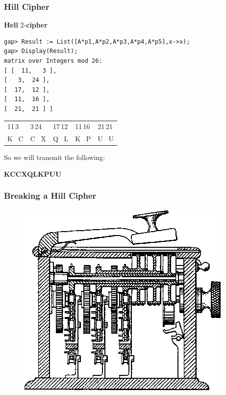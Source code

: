 \documentclass{beamer}
\theoremstyle{definition}
\theoremstyle{remark}
\begin{document}
\begin{frame}
	\frametitle{Hill Cipher}
\textbf{Hell} 2-\textbf{cipher}
\begin{verbatim}
gap> Result := List([A*p1,A*p2,A*p3,A*p4,A*p5],x->x);
gap> Display(Result);
matrix over Integers mod 26:
[ [  11,   3 ],
[   3,  24 ],
[  17,  12 ],
[  11,  16 ],
[  21,  21 ] ]
\end{verbatim}
\begin{table}
	\begin{tabular}{lllll}
		11\,3  & 3\,24   & 17\,12  & 11\,16   & 21\,21  \\
		K \, C & C \, X & Q \, L & K \, P & U \, U \\
	\end{tabular}
\end{table}
So we will transmit the following:
\centerline{\textbf{KCCXQLKPUU}}
	
\end{frame}

\begin{frame}[fragile]
	\frametitle{Breaking a Hill Cipher}
	
\begin{figure}
\includegraphics[width=0.7\linewidth]{"HillCipherMachine"}
\caption[Hill Machine]{}
\caption{}
\label{fig:HillCipherMachine}
\end{figure}
\end{frame}
\end{document}
